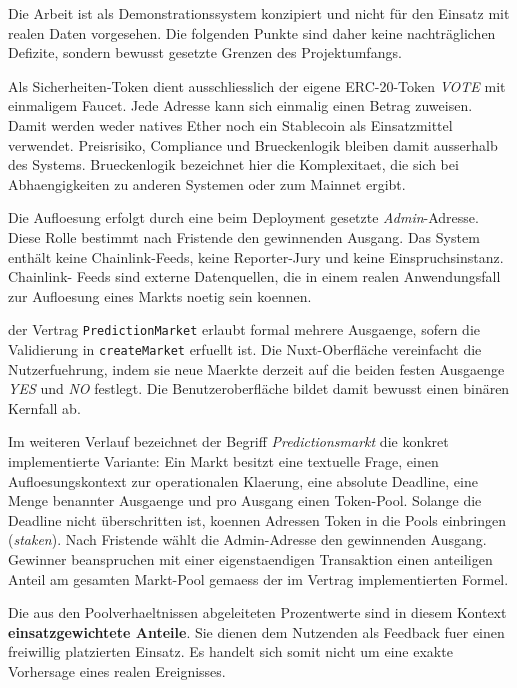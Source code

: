 Die Arbeit ist als Demonstrationssystem konzipiert und nicht für den Einsatz mit
realen Daten vorgesehen. Die folgenden Punkte sind daher keine nachträglichen
Defizite, sondern bewusst gesetzte Grenzen des Projektumfangs.

Als Sicherheiten-Token dient ausschliesslich der eigene ERC-20-Token \emph{VOTE} mit
einmaligem Faucet. Jede Adresse kann sich einmalig einen Betrag zuweisen. Damit
werden weder natives Ether noch ein Stablecoin als Einsatzmittel verwendet.
Preisrisiko, Compliance und Brueckenlogik bleiben damit ausserhalb des Systems.
Brueckenlogik bezeichnet hier die Komplexitaet, die sich bei Abhaengigkeiten zu
anderen Systemen oder zum Mainnet ergibt.

Die Aufloesung erfolgt durch eine beim Deployment gesetzte \emph{Admin}-Adresse.
Diese Rolle bestimmt nach Fristende den gewinnenden Ausgang. Das System enthält
keine Chainlink-Feeds, keine Reporter-Jury und keine Einspruchsinstanz. Chainlink-
Feeds sind externe Datenquellen, die in einem realen Anwendungsfall zur Aufloesung
eines Markts noetig sein koennen.

der Vertrag \texttt{PredictionMarket} erlaubt formal mehrere Ausgaenge, sofern
die Validierung in \texttt{createMarket} erfuellt ist. Die Nuxt-Oberfläche
vereinfacht die Nutzerfuehrung, indem sie neue Maerkte derzeit auf die beiden
festen Ausgaenge \emph{YES} und \emph{NO} festlegt. Die Benutzeroberfläche bildet
damit bewusst einen binären Kernfall ab.

Im weiteren Verlauf bezeichnet der Begriff \emph{Predictionsmarkt} die konkret
implementierte Variante: Ein Markt besitzt eine textuelle Frage, einen
Aufloesungskontext zur operationalen Klaerung, eine absolute Deadline, eine
Menge benannter Ausgaenge und pro Ausgang einen Token-Pool. Solange die Deadline
nicht überschritten ist, koennen Adressen Token in die Pools einbringen
(\emph{staken}). Nach Fristende wählt die Admin-Adresse den gewinnenden Ausgang.
Gewinner beanspruchen mit einer eigenstaendigen Transaktion einen anteiligen
Anteil am gesamten Markt-Pool gemaess der im Vertrag implementierten Formel.

Die aus den Poolverhaeltnissen abgeleiteten Prozentwerte sind in diesem Kontext
\textbf{einsatzgewichtete Anteile}. Sie dienen dem Nutzenden als Feedback fuer
einen freiwillig platzierten Einsatz. Es handelt sich somit nicht um eine exakte
Vorhersage eines realen Ereignisses.
